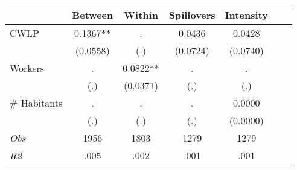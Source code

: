 \begin{tabular}{l*{6}{c}}\hline&\multicolumn{1}{c}{Between}&\multicolumn{1}{c}{Within}&\multicolumn{1}{c}{Spillovers}&\multicolumn{1}{c}{Intensity}\\ \hline 
CWLP & 0.1367** & . & 0.0436 & 0.0428 \\
 & (0.0558) & (.) & (0.0724) & (0.0740) \\
Workers & . & 0.0822** & . & . \\
 & (.) & (0.0371) & (.) & (.) \\
\# Habitants & . & . & . & 0.0000 \\
  & (.) & (.) & (.) & (0.0000) \\
\hline \textit{Obs} & 1956 & 1803 & 1279 & 1279  \\ \textit{R2} & .005 & .002 & .001 & .001 \\ \hline \end{tabular}
